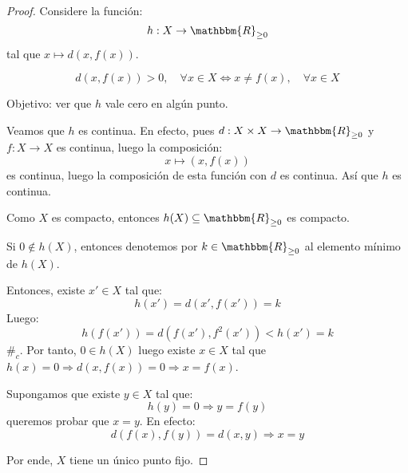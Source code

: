 \documentclass[12pt]{report}
\theoremstyle{largebreak}
\newcommand\cf[3]{\ensuremath{#1:#2\rightarrow#3}}
\newcommand\contradiction{\ensuremath{\#_c}}
\newcommand{\bbm}[1]{\ensuremath{\mathbbm{#1}}}
\begin{document}
    \begin{proof}
        Considere la función:
        \begin{equation*}
            \cf{h}{X}{\bbm{R}_{\geq0}}
        \end{equation*}
        tal que $x\mapsto d(x,f(x))$.

        \begin{equation*}
            d(x,f(x))>0,\quad\forall x\in X\iff x\neq f(x),\quad\forall x\in X
        \end{equation*}

        Objetivo: ver que $h$ vale cero en algún punto. 

        Veamos que $h$ es continua. En efecto, pues $\cf{d}{X\times X}{\bbm{R}_{\geq0}}$ y $\cf{f}{X}{X}$ es continua, luego la composición:
        \begin{equation*}
            x\mapsto (x,f(x))
        \end{equation*}
        es continua, luego la composición de esta función con $d$ es continua. Así que $h$ es continua.

        Como $X$ es compacto, entonces $h(X)\subseteq\bbm{R}_{\geq0}$ es compacto.

        Si $0\notin h(X)$, entonces denotemos por $k\in\bbm{R}_{\geq0}$ al elemento mínimo de $h(X)$.

        Entonces, existe $x'\in X$ tal que:
        \begin{equation*}
            h(x')=d(x',f(x'))=k
        \end{equation*}
        Luego:
        \begin{equation*}
            h(f(x'))=d(f(x'),f^2(x'))<h(x')=k
        \end{equation*}
        \contradiction. Por tanto, $0\in h(X)$ luego existe $x\in X$ tal que $h(x)=0\Rightarrow d(x,f(x))=0\Rightarrow x=f(x)$.

        Supongamos que existe $y\in X$ tal que:
        \begin{equation*}
            h(y)=0\Rightarrow y=f(y)
        \end{equation*}
        queremos probar que $x=y$. En efecto:
        \begin{equation*}
            d(f(x),f(y))=d(x,y)\Rightarrow x=y
        \end{equation*}

        Por ende, $X$ tiene un único punto fijo.
    \end{proof}
\end{document}
